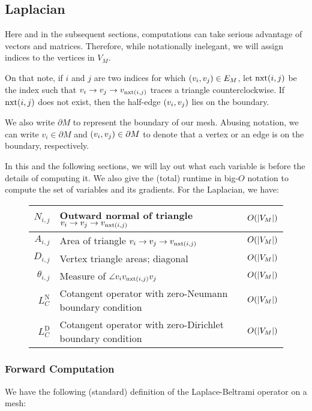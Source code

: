 \subsection{Laplacian}

Here and in the subsequent sections, computations can take serious advantage of vectors and matrices. Therefore, while notationally inelegant, we will assign indices to the vertices in \(V_M\).

On that note, if \(i\) and \(j\) are two indices for which \(\pof{v_i, v_j} \in E_M\), let \(\nxt\pof{i, j}\) be the index such that \(v_i \to v_j \to v_{\nxt\pof{i, j}}\) traces a triangle counterclockwise. If \(\nxt\pof{i, j}\) does not exist, then the half-edge \(\pof{v_i, v_j}\) lies on the boundary.

We also write \(\partial M\) to represent the boundary of our mesh. Abusing notation, we can write \(v_i \in \partial M\) and \(\pof{v_i, v_j} \in \partial M\) to denote that a vertex or an edge is on the boundary, respectively.

In this and the following sections, we will lay out what each variable is before the details of computing it. We also give the (total) runtime in big-\(O\) notation to compute the set of variables and its gradients. For the Laplacian, we have:

\begin{figure*}[h!]
    \centering
    \begin{tabular}{r|l|l}
    	\(N_{i, j}\) & Outward normal of triangle \(v_i \to v_j \to v_{\nxt\pof{i, j}}\) & \(O\pof{\abs{V_M}}\) \\ \hline
    	\(A_{i, j}\) & Area of triangle \(v_i \to v_j \to v_{\nxt\pof{i, j}}\) & \(O\pof{\abs{V_M}}\) \\ \hline
    	\(D_{i, j}\) & Vertex triangle areas; diagonal & \(O\pof{\abs{V_M}}\) \\ \hline
    	\(\theta_{i, j}\) & Measure of \(\angle v_iv_{\nxt\pof{i, j}}v_j\) & \(O\pof{\abs{V_M}}\) \\ \hline
    	\(L_C^{\text{N}}\) & Cotangent operator with zero-Neumann boundary condition & \(O\pof{\abs{V_M}}\) \\ \hline
    	\(L_C^{\text{D}}\) & Cotangent operator with zero-Dirichlet boundary condition & \(O\pof{\abs{V_M}}\)
    \end{tabular}
    \captionsetup{labelformat=empty}\caption{}
\end{figure*}

\subsubsection{Forward Computation}
We have the following (standard) definition of the Laplace-Beltrami operator on a mesh:

